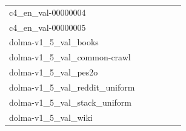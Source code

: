 \documentclass[dvipsnames]{article}
\begin{document}
\begin{appendix}
{\begin{longtable}{m{6cm}m{1.7cm}m{1.7cm}m{1.7cm}m{1.7cm}m{1.7cm}}
	c4\_en\_val-00000004  & \colorbox[HTML]{fdfedf}{\makebox[\mywidth][c]{12.56}} & \colorbox[HTML]{eaf7af}{\makebox[\mywidth][c]{12.13}} & \colorbox[HTML]{ffffe5}{\makebox[\mywidth][c]{13.27}} & \colorbox[HTML]{d9f0a3}{\makebox[\mywidth][c]{12.05}} & \colorbox[HTML]{77c578}{\makebox[\mywidth][c]{11.87}}\\
	c4\_en\_val-00000005  & \colorbox[HTML]{fefee2}{\makebox[\mywidth][c]{12.77}} & \colorbox[HTML]{e4f4ab}{\makebox[\mywidth][c]{12.35}} & \colorbox[HTML]{ffffe5}{\makebox[\mywidth][c]{13.26}} & \colorbox[HTML]{daf0a4}{\makebox[\mywidth][c]{12.32}} & \colorbox[HTML]{77c578}{\makebox[\mywidth][c]{12.18}}\\
	dolma-v1\_5\_val\_books  & \colorbox[HTML]{fefee2}{\makebox[\mywidth][c]{13.00}} & \colorbox[HTML]{d5eea1}{\makebox[\mywidth][c]{12.44}} & \colorbox[HTML]{ffffe5}{\makebox[\mywidth][c]{13.64}} & \colorbox[HTML]{d4eea0}{\makebox[\mywidth][c]{12.44}} & \colorbox[HTML]{77c578}{\makebox[\mywidth][c]{12.27}}\\
	dolma-v1\_5\_val\_common-crawl  & \colorbox[HTML]{fcfed7}{\makebox[\mywidth][c]{16.86}} & \colorbox[HTML]{ddf1a6}{\makebox[\mywidth][c]{16.37}} & \colorbox[HTML]{ffffe5}{\makebox[\mywidth][c]{18.00}} & \colorbox[HTML]{d9f0a3}{\makebox[\mywidth][c]{16.35}} & \colorbox[HTML]{77c578}{\makebox[\mywidth][c]{16.10}}\\
	dolma-v1\_5\_val\_pes2o  & \colorbox[HTML]{b6e092}{\makebox[\mywidth][c]{9.42}} & \colorbox[HTML]{dcf1a5}{\makebox[\mywidth][c]{9.56}} & \colorbox[HTML]{ffffe5}{\makebox[\mywidth][c]{11.25}} & \colorbox[HTML]{b3df91}{\makebox[\mywidth][c]{9.41}} & \colorbox[HTML]{77c578}{\makebox[\mywidth][c]{9.29}}\\
	dolma-v1\_5\_val\_reddit\_uniform  & \colorbox[HTML]{fefee3}{\makebox[\mywidth][c]{23.04}} & \colorbox[HTML]{bde395}{\makebox[\mywidth][c]{21.97}} & \colorbox[HTML]{ffffe5}{\makebox[\mywidth][c]{23.84}} & \colorbox[HTML]{d3eda0}{\makebox[\mywidth][c]{22.05}} & \colorbox[HTML]{77c578}{\makebox[\mywidth][c]{21.80}}\\
	dolma-v1\_5\_val\_stack\_uniform  & \colorbox[HTML]{b2df90}{\makebox[\mywidth][c]{2.30}} & \colorbox[HTML]{e8f6ae}{\makebox[\mywidth][c]{2.33}} & \colorbox[HTML]{ffffe5}{\makebox[\mywidth][c]{2.53}} & \colorbox[HTML]{a5d98b}{\makebox[\mywidth][c]{2.30}} & \colorbox[HTML]{77c578}{\makebox[\mywidth][c]{2.29}}\\
	dolma-v1\_5\_val\_wiki  & \colorbox[HTML]{fefee3}{\makebox[\mywidth][c]{10.86}} & \colorbox[HTML]{e9f6af}{\makebox[\mywidth][c]{10.48}} & \colorbox[HTML]{ffffe5}{\makebox[\mywidth][c]{11.25}} & \colorbox[HTML]{d1ec9f}{\makebox[\mywidth][c]{10.41}} & \colorbox[HTML]{77c578}{\makebox[\mywidth][c]{10.31}}\\

\end{longtable}}
\end{appendix}
\end{document}

